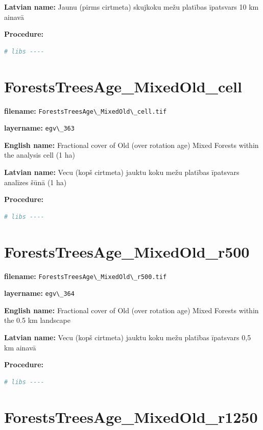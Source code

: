 \documentclass[
]{book}
\newcommand{\passthrough}[1]{#1}
\begin{document}
\textbf{Latvian name:} Jaunu (pirms cirtmeta) skujkoku mežu platības īpatsvars 10 km ainavā

\textbf{Procedure:}

\begin{lstlisting}[language=R]
# libs ----
\end{lstlisting}

\section{ForestsTreesAge\_MixedOld\_cell}\label{ch06.363}

\textbf{filename:} \passthrough{\lstinline!ForestsTreesAge\_MixedOld\_cell.tif!}

\textbf{layername:} \passthrough{\lstinline!egv\_363!}

\textbf{English name:} Fractional cover of Old (over rotation age) Mixed Forests within the analysis cell (1 ha)

\textbf{Latvian name:} Vecu (kopš cirtmeta) jauktu koku mežu platības īpatsvars analīzes šūnā (1 ha)

\textbf{Procedure:}

\begin{lstlisting}[language=R]
# libs ----
\end{lstlisting}

\section{ForestsTreesAge\_MixedOld\_r500}\label{ch06.364}

\textbf{filename:} \passthrough{\lstinline!ForestsTreesAge\_MixedOld\_r500.tif!}

\textbf{layername:} \passthrough{\lstinline!egv\_364!}

\textbf{English name:} Fractional cover of Old (over rotation age) Mixed Forests within the 0.5 km landscape

\textbf{Latvian name:} Vecu (kopš cirtmeta) jauktu koku mežu platības īpatsvars 0,5 km ainavā

\textbf{Procedure:}

\begin{lstlisting}[language=R]
# libs ----
\end{lstlisting}

\section{ForestsTreesAge\_MixedOld\_r1250}\label{ch06.365}
\end{document}

